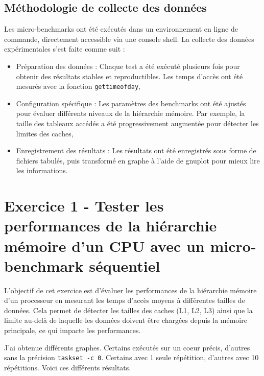 \documentclass{rapport}
\begin{document}
      \subsection{Méthodologie de collecte des données}
      Les micro-benchmarks ont été exécutés dans un environnement en ligne de commande, directement accessible via une console shell. La collecte des données expérimentales s’est faite comme suit :
        \begin{itemize}
          \item Préparation des données : Chaque test a été exécuté plusieurs fois pour obtenir des résultats stables et reproductibles. Les temps d’accès ont été mesurés avec la fonction \verb:gettimeofday:,
          \item Configuration spécifique : Les paramètres des benchmarks ont été ajustés pour évaluer différents niveaux de la hiérarchie mémoire. Par exemple, la taille des tableaux accédés a été progressivement augmentée pour détecter les limites des caches,
          \item Enregistrement des résultats : Les résultats ont été enregistrés sous forme de fichiers tabulés, puis transformé en graphe à l'aide de gnuplot pour mieux lire les informations.
        \end{itemize}


    \section{Exercice 1 - Tester les performances de la hiérarchie mémoire d’un CPU avec un micro-benchmark séquentiel}

    L’objectif de cet exercice est d’évaluer les performances de la hiérarchie mémoire d’un processeur en mesurant les temps d’accès moyens à différentes tailles de données. Cela permet de détecter les tailles des caches (L1, L2, L3) ainsi que la limite au-delà de laquelle les données doivent être chargées depuis la mémoire principale, ce qui impacte les performances.

    J'ai obtenue différents graphes. Certains exécutés sur un coeur précis, d'autres sans la précision \verb:taskset -c 0:. Certains avec 1 seule répétition, d'autres avec 10 répétitions. Voici ces différents résultats.
\end{document}
